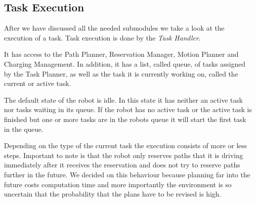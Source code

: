 \documentclass[journal]{IEEEtran}
\begin{document}
\subsection{Task Execution}
\label{subsec:task_execution}
After we have discussed all the needed submodules we take a look at the execution of a task. Task execution is done by the \textit{Task Handler}.

It has access to the Path Planner, Reservation Manager, Motion Planner and Charging Management. In addition, it has a list, called queue, of tasks assigned by the Task Planner, as well as the task it is currently working on, called the current or active task.

The default state of the robot is idle. In this state it has neither an active task nor tasks waiting in its queue. If the robot has no active task or the active task is finished but one or more tasks are in the robots queue it will start the first task in the queue.

Depending on the type of the current task the execution consists of more or less steps. Important to note is that the robot only reserves paths that it is driving immediately after it receives the reservation and does not try to reserve paths further in the future. We decided on this behaviour because planning far into the future costs computation time and more importantly the environment is so uncertain that the probability that the plans have to be revised is high.
\end{document}
